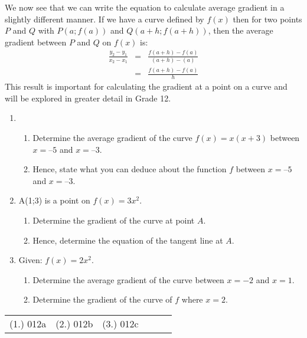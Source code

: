 We now see that we can write the equation to calculate average gradient in a slightly different manner. If we have a curve defined by $f(x)$ then for two points $P$ and $Q$ with $P(a;f(a))$ and $Q(a+h;f(a+h))$, then the average gradient between $P$ and $Q$ on $f(x)$ is:
\begin{eqnarray*}
\frac{y_2-y_1}{x_2-x_1}&=&\frac{f(a+h)-f(a)}{(a+h)-(a)}\\
&=&\frac{f(a+h)-f(a)}{h}
\end{eqnarray*}
This result is important for calculating the gradient at a point on a curve and will be explored in greater detail in Grade 12.

\begin{eocexercises}{}
\begin{enumerate}
\item{}
\begin{enumerate}
\item{Determine the average gradient of the curve $f(x) = x(x+3)$ between $x = 5$ and $x = 3$.}
\item{Hence, state what you can deduce about the function $f$ between $x = 5$ and $x = 3$.}
\end{enumerate}
\item{A(1;3) is a point on $f(x)=3x^2$.}{
\begin{enumerate}
\item{Determine the gradient of the curve at point $A$.}
\item{Hence, determine the equation of the tangent line at $A$.}
\end{enumerate}
}
\item{Given: $f(x)=2x^2$.}{
\begin{enumerate}
\item{Determine the average gradient of the curve between $x=-2$ and $x=1$.}
\item{Determine the gradient of the curve of $f$ where $x=2$.}
\end{enumerate}}
\end{enumerate}



\par \practiceinfo
\par \begin{tabular}[h]{cccccc}
(1.)	012a	&
(2.)	012b	&
(3.)	012c	&
\end{tabular}
\end{eocexercises} 




